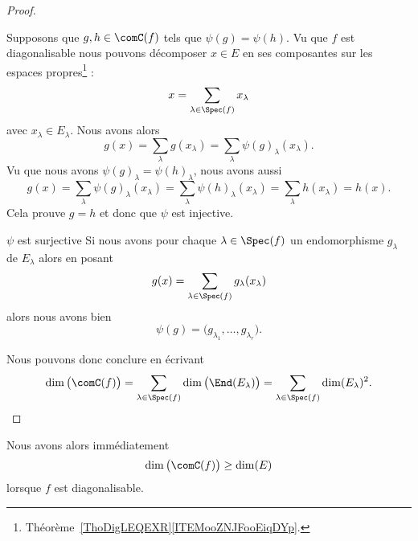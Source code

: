 \begin{proof}
\begin{subproof}
        Supposons que \( g,h\in\comC(f)\) tels que \( \psi(g)=\psi(h)\). Vu que \( f\) est diagonalisable nous pouvons décomposer \( x\in  E\) en ses composantes sur les espaces propres\footnote{Théorème~\ref{ThoDigLEQEXR}\ref{ITEMooZNJFooEiqDYp}.} :
        \begin{equation}
            x=\sum_{\lambda\in\Spec(f)}x_{\lambda}
        \end{equation}
        avec \( x_{\lambda}\in E_{\lambda}\).  Nous avons alors
        \begin{equation}
            g(x)=\sum_{\lambda}g(x_{\lambda})=\sum_{\lambda}\psi(g)_{\lambda}(x_{\lambda}).
        \end{equation}
        Vu que nous avons \( \psi(g)_{\lambda}=\psi(h)_{\lambda}\), nous avons aussi
        \begin{equation}
            g(x)=\sum_{\lambda}\psi(g)_{\lambda}(x_{\lambda})=\sum_{\lambda}\psi(h)_{\lambda}(x_{\lambda})=\sum_{\lambda}h(x_{\lambda})=h(x).
        \end{equation}
        Cela prouve \( g=h\) et donc que \( \psi\) est injective.
    \item[\( \psi\) est surjective]
        Si nous avons pour chaque \( \lambda\in\Spec(f)\) un endomorphisme \( g_{\lambda}\) de \( E_{\lambda}\) alors en posant
        \begin{equation}
            g(x)=\sum_{\lambda\in\Spec(f)}g_{\lambda}(x_{\lambda})
        \end{equation}
        alors nous avons bien
        \begin{equation}
            \psi(g)=\big( g_{\lambda_1},\ldots, g_{\lambda_r} \big).
        \end{equation}
    \end{subproof}
    Nous pouvons donc conclure en écrivant
    \begin{equation}
        \dim\big( \comC(f) \big)=\sum_{\lambda\in\Spec(f)}\dim\big( \End(E_{\lambda}) \big)= \sum_{\lambda\in\Spec(f)}\dim(E_{\lambda})^2.
    \end{equation}
\end{proof}

\begin{remark}      \label{REMooUGFQooVzCOvV}
    Nous avons alors immédiatement
    \begin{equation}
        \dim\big( \comC(f) \big)\geq\dim(E)
    \end{equation}
    lorsque \( f\) est diagonalisable.
\end{remark}

